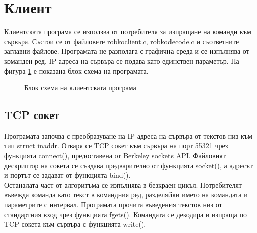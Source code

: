 \section{Клиент}
Клиентската програма се използва от потребителя за изпращане на команди към сървъра. Състои се от файловете robko\textunderscore client.c, robko\textunderscore decode.c и съответните заглавни файлове. Програмата не разполага с графична среда и се изпълнява от команден ред. IP адреса на сървъра се подава като единствен параметър. На фигура \ref{fig:flch_client} е показана блок схема на програмата.
\begin{figure}[!htb]
    \centering
    \caption{Блок схема на клиентската програма}
    \label{fig:flch_client}
\end{figure}
\subsection{TCP сокет}
Програмата започва с преобразуване на IP адреса на сървъра от текстов низ към тип struct in\textunderscore addr. Отваря се TCP сокет към сървъра на порт 55321 чрез функцията connect(), предоставена от Berkeley sockets API. Файловият дескриптор на сокета се създава предварително от функцията socket(), а адресът и портът се задават от функцията bind().\\
\indent{}
Останалата част от алгоритъма се изпълнява в безкраен цикъл. Потребителят въвежда команда като текст в командния ред, разделяйки името на командата и параметрите с интервал. Програмата прочита въведения текстов низ от стандартния вход чрез функцията fgets(). Командата се декодира и изпраща по TCP сокета към сървъра с функцията write().
